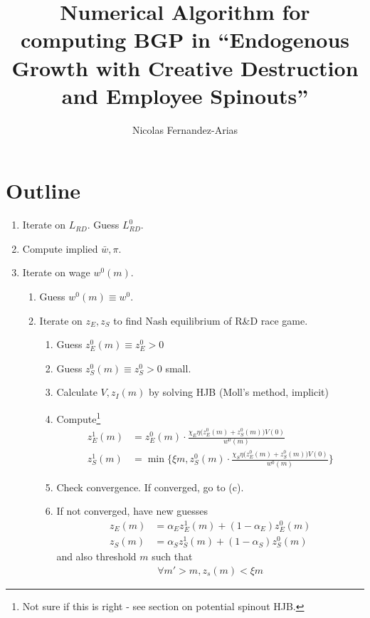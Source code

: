 \documentclass[12pt,english]{article}
\theoremstyle{remark}
\begin{document}
	
\title{Numerical Algorithm for computing BGP in ``Endogenous Growth with Creative Destruction and Employee Spinouts''}
\author{Nicolas Fernandez-Arias}
\maketitle

\section{Outline}

\begin{enumerate}
	\item Iterate on $L_{RD}$. Guess $L^0_{RD}$.  
	\item Compute implied $\bar{w},\pi$.
	\item Iterate on wage $w^0(m)$. 
	\begin{enumerate}
		\item Guess $w^0(m) \equiv w^0$.
		\item Iterate on $z_E,z_S$ to find Nash equilibrium of R\&D race game.
		\begin{enumerate}
			\item Guess $z_E^0(m) \equiv z_E^0 > 0$
			\item Guess $z_S^0(m) \equiv z_S^0 > 0$ small.
			\item Calculate $V,z_I(m)$ by solving HJB (Moll's method, implicit)
			\item Compute\footnote{Not sure if this is right - see section on potential spinout HJB.}
			\begin{align*}
			z_E^1(m) &= z_E^0(m) \cdot \frac{\chi_E \eta \big(z_E^0(m) + z_S^0(m)\big)V(0)}{w^0(m)} \\
			z_S^1(m) &= \min\Bigg\{\xi m,z_S^0(m) \cdot \frac{\chi_S \eta \big(z_E^0(m) + z_S^0(m)\big)V(0)}{w^0(m)}\Bigg\}
			\end{align*}
			\item Check convergence. If converged, go to (c).
			\item If not converged, have new guesses
			\begin{align*}
			z_E(m) &= \alpha_E z_E^1(m) + (1-\alpha_E) z_E^0(m) \\
			z_S(m) &= \alpha_S z_S^1(m) + (1-\alpha_S) z_S^0(m) 
			\end{align*}
			and also threshold $m$ such that
			\begin{align*}
				\forall m' > m, z_s(m) < \xi m
			\end{align*}

\end{enumerate}
\end{enumerate}
\end{enumerate}
\end{document}
